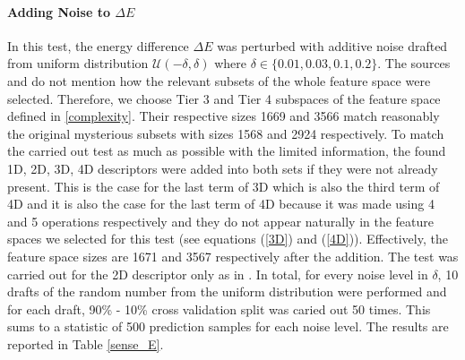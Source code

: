 \documentclass[11pt,oneside,czech,american]{book} %
\theoremstyle{plain}
\theoremstyle{definition}
\begin{document}
\paragraph{Adding Noise to $\Delta E$}
In this test, the energy difference $\Delta E$ was perturbed with additive noise drafted from uniform distribution $\mathcal{U}(-\delta, \delta)$ where $\delta \in \{0.01, 0.03, 0.1, 0.2\}$. The sources \parencite{ghiringhelli15} and \parencite{ghiringhelli17} do not mention how the relevant subsets of the whole feature space were selected. Therefore, we choose Tier 3 and Tier 4 subspaces of the feature space defined in \ref{complexity}. Their respective sizes 1669 and 3566 match reasonably the original mysterious subsets with sizes 1568 and 2924 respectively. To match the carried out test as much as possible with the limited information, the found 1D, 2D, 3D, 4D descriptors were added into both sets if they were not already present. This is the case for the last term of 3D which is also the third term of 4D and it is also the case for the last term of 4D because it was made using 4 and 5 operations respectively and they do not appear naturally in the feature spaces we selected for this test (see equations (\ref{3D}) and (\ref{4D})). Effectively, the feature space sizes are 1671 and 3567 respectively after the addition. The test was carried out for the 2D descriptor only as in \parencite{ghiringhelli17}. In total, for every noise level in $\delta$, 10 drafts of the random number from the uniform distribution were performed and for each draft, 90\% - 10\% cross validation split was caried out 50 times. This sums to a statistic of 500 prediction samples for each noise level. The results are reported in Table \ref{sense_E}.
\end{document}
